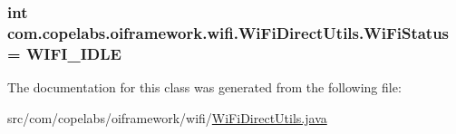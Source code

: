 \subsubsection[{Wi\+Fi\+Status}]{\setlength{\rightskip}{0pt plus 5cm}int com.\+copelabs.\+oiframework.\+wifi.\+Wi\+Fi\+Direct\+Utils.\+Wi\+Fi\+Status = {\bf W\+I\+F\+I\+\_\+\+I\+D\+L\+E}}\label{classcom_1_1copelabs_1_1oiframework_1_1wifi_1_1_wi_fi_direct_utils_a8269883cca84fb65980b9e685d79e1f2}


The documentation for this class was generated from the following file\+:\begin{DoxyCompactItemize}
\item 
src/com/copelabs/oiframework/wifi/\hyperlink{_wi_fi_direct_utils_8java}{Wi\+Fi\+Direct\+Utils.\+java}\end{DoxyCompactItemize}
